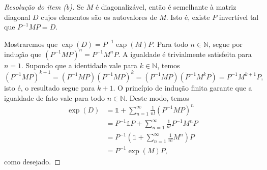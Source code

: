 \begin{proof}[Resolução do item (b)]
    Se \(M\) é diagonalizável, então é semelhante à matriz diagonal \(D\) cujos elementos são os autovalores de \(M\). Isto é, existe \(P\) invertível tal que \(P^{-1}MP = D\).

    Mostraremos que \(\exp(D) = P^{-1}\exp(M)P\). Para todo \(n \in \mathbb{N}\), segue por indução que \((P^{-1}MP)^n = P^{-1} M^nP\). A igualdade é trivialmente satisfeita para \(n = 1\). Supondo que a identidade vale para \(k \in \mathbb{N}\), temos
    \begin{equation*}
        (P^{-1}MP)^{k+1} = (P^{-1}MP)(P^{-1}MP)^k = (P^{-1}MP)(P^{-1}M^kP) = P^{-1} M^{k+1} P,
    \end{equation*}
    isto é, o resultado segue para \(k + 1\). O princípio de indução finita garante que a igualdade de fato vale para todo \(n \in \mathbb{N}\). Deste modo, temos
    \begin{align*}
        \exp(D) &= \mathds{1} + \sum_{n = 1}^\infty \frac{1}{n!} (P^{-1}MP)^n\\
                &= P^{-1}\mathds{1} P + \sum_{n = 1}^\infty \frac1{n!}P^{-1} M^n P\\
                &= P^{-1} \left(\mathds{1} + \sum_{n=1}^\infty \frac{1}{n!} M^n\right)P\\
                &= P^{-1} \exp(M) P,
    \end{align*}
    como desejado.


\end{proof}
